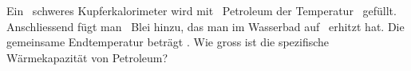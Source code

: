 Ein \mCuO\ schweres Kupferkalorimeter wird mit \mPeO\ Petroleum der Temperatur \TaO\ gefüllt. Anschliessend fügt man \mPbO\ Blei hinzu, das man im Wasserbad auf \TPbO\ erhitzt hat. Die gemeinsame Endtemperatur beträgt \TmO. Wie gross ist die spezifische Wärmekapazität von Petroleum?
